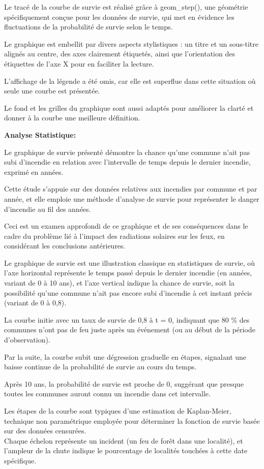 \documentclass[
]{article}
\begin{document}
Le tracé de la courbe de survie est réalisé grâce à geom\_step(), une
géométrie spécifiquement conçue pour les données de survie, qui met en
évidence les fluctuations de la probabilité de survie selon le temps.

Le graphique est embellit par divers aspects stylistiques : un titre et
un sous-titre alignés au centre, des axes clairement étiquetés, ainsi
que l'orientation des étiquettes de l'axe X pour en faciliter la
lecture.

L'affichage de la légende a été omis, car elle est superflue dans cette
situation où seule une courbe est présentée.

Le fond et les grilles du graphique sont aussi adaptés pour améliorer la
clarté et donner à la courbe une meilleure définition.

\textbf{Analyse Statistique:}

Le graphique de survie présenté démontre la chance qu'une commune n'ait
pas subi d'incendie en relation avec l'intervalle de temps depuis le
dernier incendie, exprimé en années.

Cette étude s'appuie sur des données relatives aux incendies par commune
et par année, et elle emploie une méthode d'analyse de survie pour
représenter le danger d'incendie au fil des années.

Ceci est un examen approfondi de ce graphique et de ses conséquences
dans le cadre du problème lié à l'impact des radiations solaires sur les
feux, en considérant les conclusions antérieures.

Le graphique de survie est une illustration classique en statistiques de
survie, où l'axe horizontal représente le temps passé depuis le dernier
incendie (en années, variant de 0 à 10 ans), et l'axe vertical indique
la chance de survie, soit la possibilité qu'une commune n'ait pas encore
subi d'incendie à cet instant précis (variant de 0 à 0,8).

La courbe initie avec un taux de survie de 0,8 à t = 0, indiquant que 80
\% des communes n'ont pas de feu juste après un événement (ou au début
de la période d'observation).

Par la suite, la courbe subit une dégression graduelle en étapes,
signalant une baisse continue de la probabilité de survie au cours du
temps.

Après 10 ans, la probabilité de survie est proche de 0, suggérant que
presque toutes les communes auront connu un incendie dans cet
intervalle.

Les étapes de la courbe sont typiques d'une estimation de Kaplan-Meier,
technique non paramétrique employée pour déterminer la fonction de
survie basée sur des données censurées.\\
Chaque échelon représente un incident (un feu de forêt dans une
localité), et l'ampleur de la chute indique le pourcentage de localités
touchées à cette date spécifique.
\end{document}
